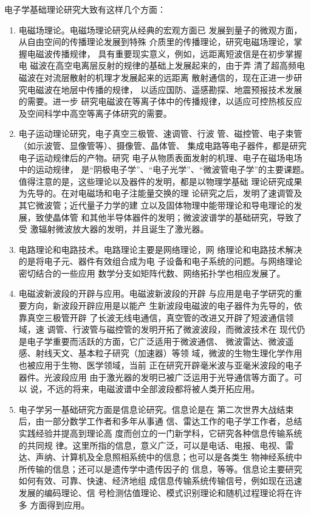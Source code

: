 电子学基础理论研究大致有这样几个方面：
\begin{enumerate}

\item 电磁场理论。电磁场理论研究从经典的宏观方面已
发展到量子的微观方面，从自由空间的传播理论发展到特殊
介质里的传播理论，研究电磁场理论，掌握电磁波传播规律，
具有重要现实意义，例如，远距离短波信是在初步掌握电
磁波在高空电离层反射的规律的基础上发展起来的，由于弄
清了超高频电磁波在对流层散射的机理才发展起来的远距离
散射通信的，现在正进一步研究电磁波在地层中传播的规律，
以适应国防、遥感勘探、地震预报技术发展的需要。进一步
研究电磁波在等离子体中的传播规律，以适应可控热核反应
及空间科学中高空等离子体研究的需要。
\item 电子运动理论研究，电子真空三极管、速调管、行波
管、磁控管、电子束管（如示波管、显像管等）、摄像管、晶体管、
集成电路等电子器件，都是研究电子运动规律后的产物。研究
电子从物质表面发射的机理、电子在磁场电场中的运动规律，
是“阴极电子学”、“电子光学”、“微波管电子学”的主要课题。
值得注意的是，这些理论以及器件的发明，都是以物理学基础
理论研究成果为先导的。在对电磁场和电子注能量交换的理
论研究之后，发明了速调管及其它微波管；近代量子力学的建
立以及固体物理中能带理论和导电理论的发展，致使晶体管
和其他半导体器件的发明；微波波谱学的基础研究，导致了受
激辐射微波放大器的发明，并且诞生了激光器。
\item 电路理论和电路技术。电路理论主要是网络理论，网
络理论和电路技术解决的是将电子元、器件有效组合成为电
子设备和电子系统的问题。与网络理论密切结合的一些应用
数学分支如矩阵代数、网络拓扑学也相应发展了。
\item 电磁波新波段的开辟与应用。电磁波新波段的开辟
与应用是电子学研究的重要方向，新波段开辟应用是以能产
生新波段电磁波的电子器件为先导的，依靠真空三极管开辟
了长波无线电通信，真空管的改进又开辟了短波通信领域，速
调管、行波管与磁控管的发明开拓了微波波段，而微波技术在
现代仍是电子学重要而活跃的方面，它广泛适用于微波通信、
微波雷达、微波遥感、射线天文、基本粒子研究（加速器）等领
域，微波的生物生理化学作用也被应用于生物、医学领域，当前
正在研究开辟毫米波与亚毫米波段的电子器件。光波段应用
由于激光器的发明已被广泛运用于光导通信等方面了。可以
说，不远的将来，电磁波谱中全部波段都将被人类开拓应用。
\item 电子学另一基础研究方面是信息论研究。信息论是在
第二次世界大战结束后，由一部分数学工作者和多年从事通
信、雷达工作的电子学工作者，总结实践经验并提高到理论高
度而创立的一门新学科，它研究各种信息传输系统的共同规
律。这里所指的信息，意义广泛，可以是电话、电报、电视、雷
达、声纳、计算机及全息照相系统中的信息；也可以是各类生
物神经系统中所传输的信息；还可以是遗传学中遗传因子的
信息，等等。信息论主要研究如何有效、可靠、快速、经济地组
成信息传输系统传输信号，例如现在迅速发展的编码理论、信
号检测估值理论、模式识别理论和随机过程理论将在许多
方面得到应用。

\end{enumerate}

